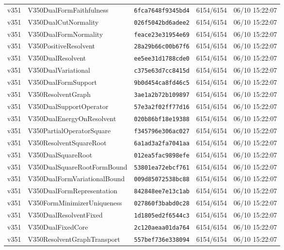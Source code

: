 \documentclass[11pt]{article}
\theoremstyle{definition}\newtheorem{deriv}{Derivação}
\begin{document}
{\begin{longtable}{@{}lllll@{}}
v351 & V350DualFormFaithfulness & \texttt{6fca7648f9345bd4} & 6154/6154 & 06/10 15:22:07 \\
v351 & V350DualCutNormality & \texttt{026f5042bd6adee2} & 6154/6154 & 06/10 15:22:07 \\
v351 & V350DualFormNormality & \texttt{feace23e31954e69} & 6154/6154 & 06/10 15:22:07 \\
v351 & V350PositiveResolvent & \texttt{28a29b66c00b67f6} & 6154/6154 & 06/10 15:22:07 \\
v351 & V350DualResolvent & \texttt{ee5ee31d1788cde0} & 6154/6154 & 06/10 15:22:07 \\
v351 & V350DualVariational & \texttt{c375e63d7cc8415d} & 6154/6154 & 06/10 15:22:07 \\
v351 & V350DualFormSupport & \texttt{9b0d454ca8fd46c5} & 6154/6154 & 06/10 15:22:07 \\
v351 & V350ResolventGraph & \texttt{3ae1a2b72b109897} & 6154/6154 & 06/10 15:22:07 \\
v351 & V350DualSupportOperator & \texttt{57e3a2f02ff77d16} & 6154/6154 & 06/10 15:22:07 \\
v351 & V350DualEnergyOnResolvent & \texttt{020b86bf18e19388} & 6154/6154 & 06/10 15:22:07 \\
v351 & V350PartialOperatorSquare & \texttt{f345796e306ac027} & 6154/6154 & 06/10 15:22:07 \\
v351 & V350ResolventSquareRoot & \texttt{6a1ad3a2fa7041aa} & 6154/6154 & 06/10 15:22:07 \\
v351 & V350DualSquareRoot & \texttt{012ea5fac9898efe} & 6154/6154 & 06/10 15:22:07 \\
v351 & V350DualSquareRootFormBound & \texttt{53801ea72ebcf761} & 6154/6154 & 06/10 15:22:07 \\
v351 & V350DualFormVariationalBound & \texttt{009d85072538bc88} & 6154/6154 & 06/10 15:22:07 \\
v351 & V350DualFormRepresentation & \texttt{842848ee7e13c1ab} & 6154/6154 & 06/10 15:22:07 \\
v351 & V350FormMinimizerUniqueness & \texttt{027860f3babd0c28} & 6154/6154 & 06/10 15:22:07 \\
v351 & V350DualResolventFixed & \texttt{1d1805ed2f6544c3} & 6154/6154 & 06/10 15:22:07 \\
v351 & V350DualFixedCore & \texttt{2c120aeaa01da764} & 6154/6154 & 06/10 15:22:07 \\
v351 & V350ResolventGraphTransport & \texttt{557bef736e338094} & 6154/6154 & 06/10 15:22:07 \\

\end{longtable}}
\end{document}
